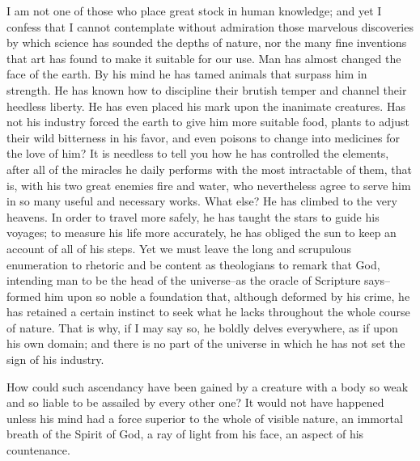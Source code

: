 \documentclass[10pt, twoside]{article}
\begin{document}
I am not one of those who place great stock in human knowledge; and yet I confess that I cannot contemplate without admiration those marvelous discoveries by which science has sounded the depths of nature, nor the many fine inventions that art has found to make it suitable for our use. Man has almost changed the face of the earth. By his mind he has tamed animals that surpass him in strength. He has known how to discipline their brutish temper and channel their heedless liberty. He has even placed his mark upon the inanimate creatures. Has not his industry forced the earth to give him more suitable food, plants to adjust their wild bitterness in his favor, and even poisons to change into medicines for the love of him? It is needless to tell you how he has controlled the elements, after all of the miracles he daily performs with the most intractable of them, that is, with his two great enemies fire and water, who nevertheless agree to serve him in so many useful and necessary works. What else? He has climbed to the very heavens. In order to travel more safely, he has taught the stars to guide his voyages; to measure his life more accurately, he has obliged the sun to keep an account of all of his steps. Yet we must leave the long and scrupulous enumeration to rhetoric and be content as theologians to remark that God, intending man to be the head of the universe--as the oracle of Scripture says--formed him upon so noble a foundation that, although deformed by his crime, he has retained a certain instinct to seek what he lacks throughout the whole course of nature. That is why, if I may say so, he boldly delves everywhere, as if upon his own domain; and there is no part of the universe in which he has not set the sign of his industry.

How could such ascendancy have been gained by a creature with a body so weak and so liable to be assailed by every other one? It would not have happened unless his mind had a force superior to the whole of visible nature, an immortal breath of the Spirit of God, a ray of light from his face, an aspect of his countenance.
\end{document}

